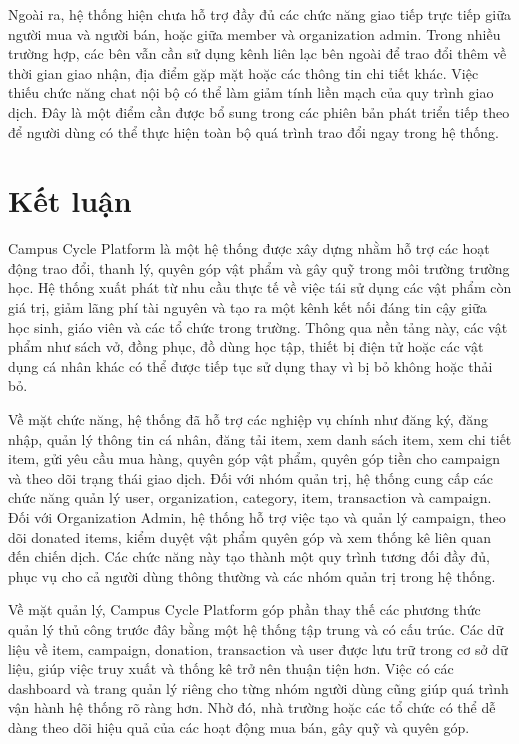 \documentclass[12pt,a4paper]{report}
\begin{document}
Ngoài ra, hệ thống hiện chưa hỗ trợ đầy đủ các chức năng giao tiếp trực tiếp giữa người mua và người bán, hoặc giữa member và organization admin. Trong nhiều trường hợp, các bên vẫn cần sử dụng kênh liên lạc bên ngoài để trao đổi thêm về thời gian giao nhận, địa điểm gặp mặt hoặc các thông tin chi tiết khác. Việc thiếu chức năng chat nội bộ có thể làm giảm tính liền mạch của quy trình giao dịch. Đây là một điểm cần được bổ sung trong các phiên bản phát triển tiếp theo để người dùng có thể thực hiện toàn bộ quá trình trao đổi ngay trong hệ thống.

\section{Kết luận}

Campus Cycle Platform là một hệ thống được xây dựng nhằm hỗ trợ các hoạt động trao đổi, thanh lý, quyên góp vật phẩm và gây quỹ trong môi trường trường học. Hệ thống xuất phát từ nhu cầu thực tế về việc tái sử dụng các vật phẩm còn giá trị, giảm lãng phí tài nguyên và tạo ra một kênh kết nối đáng tin cậy giữa học sinh, giáo viên và các tổ chức trong trường. Thông qua nền tảng này, các vật phẩm như sách vở, đồng phục, đồ dùng học tập, thiết bị điện tử hoặc các vật dụng cá nhân khác có thể được tiếp tục sử dụng thay vì bị bỏ không hoặc thải bỏ.

Về mặt chức năng, hệ thống đã hỗ trợ các nghiệp vụ chính như đăng ký, đăng nhập, quản lý thông tin cá nhân, đăng tải item, xem danh sách item, xem chi tiết item, gửi yêu cầu mua hàng, quyên góp vật phẩm, quyên góp tiền cho campaign và theo dõi trạng thái giao dịch. Đối với nhóm quản trị, hệ thống cung cấp các chức năng quản lý user, organization, category, item, transaction và campaign. Đối với Organization Admin, hệ thống hỗ trợ việc tạo và quản lý campaign, theo dõi donated items, kiểm duyệt vật phẩm quyên góp và xem thống kê liên quan đến chiến dịch. Các chức năng này tạo thành một quy trình tương đối đầy đủ, phục vụ cho cả người dùng thông thường và các nhóm quản trị trong hệ thống.

Về mặt quản lý, Campus Cycle Platform góp phần thay thế các phương thức quản lý thủ công trước đây bằng một hệ thống tập trung và có cấu trúc. Các dữ liệu về item, campaign, donation, transaction và user được lưu trữ trong cơ sở dữ liệu, giúp việc truy xuất và thống kê trở nên thuận tiện hơn. Việc có các dashboard và trang quản lý riêng cho từng nhóm người dùng cũng giúp quá trình vận hành hệ thống rõ ràng hơn. Nhờ đó, nhà trường hoặc các tổ chức có thể dễ dàng theo dõi hiệu quả của các hoạt động mua bán, gây quỹ và quyên góp.
\end{document}
